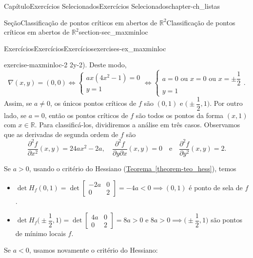 \documentclass[oneside,10pt,]{book}
\newcommand{\xreffont}{\relax}
\numberwithin{equation}{section}
\newcommand{\R}{\mathbb R}
\begin{document}
\begin{chapterptx}{Capítulo}{Exercícios Selecionados}{}{Exercícios Selecionados}{}{}{chapter-ch_listas}
\begin{sectionptx}{Seção}{Classificação de pontos críticos em abertos de \(\R^2\)}{}{Classificação de pontos críticos em abertos de \(\R^2\)}{}{}{section-sec_maxminloc}
\begin{exercises-subsection-numberless}{Exercícios}{Exercícios}{}{Exercícios}{}{}{exercises-ex_maxminloc}
\begin{divisionexercise}{2}{}{}{exercise-maxminloc-2}
2y-2)\). Deste modo,%
\begin{equation*}
\nabla(x,y) = (0,0) \iff
\begin{cases} ax(4x^2-1)=0\\ y=1 \end{cases} \iff \begin{cases}
a=0 \text{ ou } x=0\text{ ou }x= \pm \dfrac{1}{2} \\ y=1 \end{cases}.
\end{equation*}
Assim, se \(a\neq 0\), os únicos pontos críticos de \(f\) são \((0,1)\) e \(\Big(\pm \dfrac{1}{2}, 1\Big)\). Por outro lado, se \(a=0\), então os pontos críticos de \(f\) são todos os pontos da forma \((x,1)\) com \(x \in \R\). Para classificá-los, dividiremos a análise em três casos. Observamos que as derivadas de segunda ordem de \(f\) são%
\begin{equation*}
\frac{\partial^2 f}{\partial x^2}(x,y) = 24a x^2 -2a, \quad
\frac{\partial^2 f}{\partial y \partial x}(x,y) = 0 \quad
\text{e} \quad \frac{\partial^2 f}{\partial y^2} (x,y) = 2.
\end{equation*}
%
\par
Se \(a>0\), usando o critério do Hessiano (\hyperref[theorem-teo_hess]{Teorema~{\xreffont\ref{theorem-teo_hess}}}), temos%
\begin{itemize}[label=\textbullet]
\item{}\(\det H_f(0,1) = \det\begin{bmatrix}
-2a & 0\\
0 & 2
\end{bmatrix} = -4a < 0 \implies (0,1)\) é ponto de sela de \(f\).%
\item{}\(\det H_f\Big(\pm\dfrac{1}{2},1\Big) = \det\begin{bmatrix}
4a & 0\\
0 & 2
\end{bmatrix} = 8a > 0\) e \(8a>0 \implies
\Big(\pm\dfrac{1}{2},1\Big)\) são pontos de mínimo locais \(f\).%
\end{itemize}
%
\par
Se \(a<0\), usamos novamente o critério do Hessiano:%
\end{divisionexercise}
\end{exercises-subsection-numberless}
\end{sectionptx}
\end{chapterptx}
\end{document}
